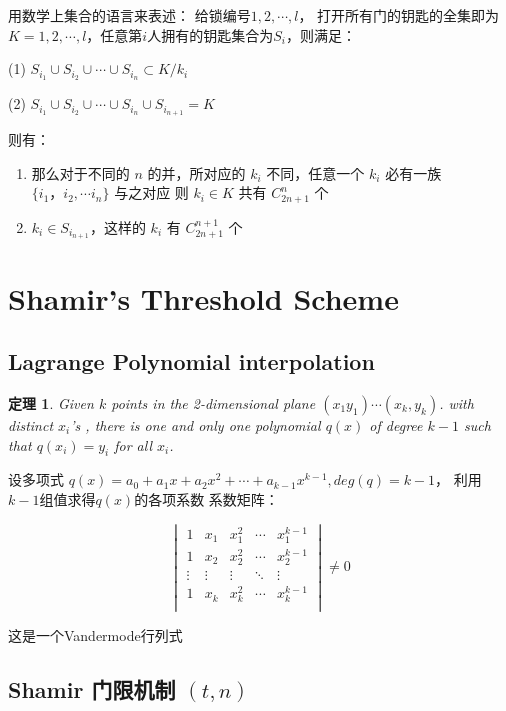 \documentclass[12pt, a4paper, oneside]{ctexbook}
\newtheorem{theorem}{定理}[section]
\begin{document}
用数学上集合的语言来表述： 给锁编号$1,2,\cdots,l$， 打开所有门的钥匙的全集即为 $K = {1,2,\cdots,l}$，任意第$i$人拥有的钥匙集合为$S_i$，则满足：

(1) $S_{i_1} \cup S_{i_2}\cup \cdots\cup S_{i_n} \subset K/k_i$\par
(2) $S_{i_1} \cup S_{i_2}\cup \cdots \cup S_{i_n}\cup S_{i_{n+1}} = K$
 
则有：
\begin{enumerate}
    \item 那么对于不同的 $n$ 的并，所对应的 $k_i$ 不同，任意一个 $k_i$ 必有一族 $\{i_1，i_2,\cdots i_n\}$ 与之对应 则 $k_i\in K$ 共有 $C_{2n+1}^n$ 个
    \item $k_i \in S_{i_{n+1}}$，这样的 $k_i$ 有 $C_{2n+1}^{n+1}$ 个
\end{enumerate} 



\section{Shamir's Threshold Scheme}

\subsection{Lagrange Polynomial interpolation} 

\begin{theorem}
Given $k$ points in the 2-dimensional plane $(x_1 y_1) \cdots (x_k, y_k)$. 
with distinct $x_i$'s , there is one and only one polynomial $q(x)$ of degree $k - 1$ such that $q(x_i) =y_i$ for all $x_i$.        
\end{theorem}

设多项式 $q(x) = a_0 + a_1 x + a_2 x^2 + \cdots+ a_{k-1} x^{k-1}, deg(q) = k-1$，  利用$k-1$组值求得$q(x)$的各项系数  
系数矩阵：

$$\begin{vmatrix}
1 & x_1 & x_1^2 & \cdots & x_1^{k-1} \\
1 & x_2 & x_2^2 & \cdots & x_2^{k-1} \\
\vdots & \vdots & \vdots & \ddots & \vdots \\
1 & x_k & x_k^2 & \cdots & x_k^{k-1} \\
\end{vmatrix} \neq 0$$

这是一个Vandermode行列式 

\subsection{Shamir 门限机制 $(t,n)$}
\end{document}
